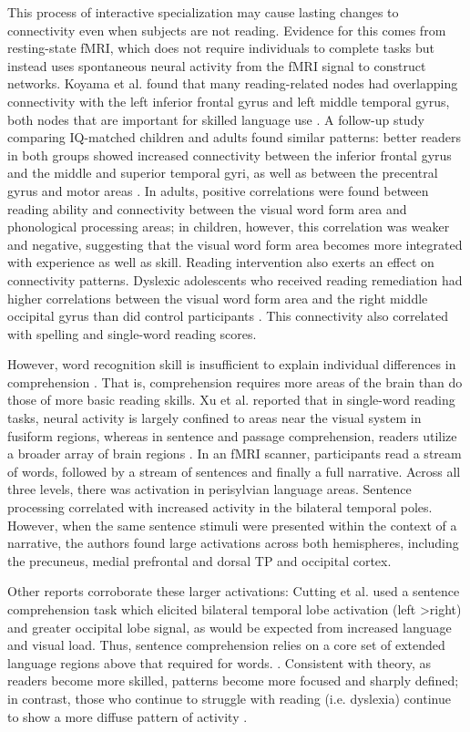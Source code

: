 This process of interactive specialization may cause lasting changes to connectivity even when subjects are not reading. Evidence for this comes from resting-state fMRI, which does not require individuals to complete tasks but instead uses spontaneous neural activity from the fMRI signal to construct networks. Koyama et al. found that many reading-related nodes had overlapping connectivity with the left inferior frontal gyrus and left middle temporal gyrus, both nodes that are important for skilled language use \cite{Koyama2010}. A follow-up study comparing IQ-matched children and adults found similar patterns: better readers in both groups showed increased connectivity between the inferior frontal gyrus and the middle and superior temporal gyri, as well as between the precentral gyrus and motor areas \cite{Koyama2011}. In adults, positive correlations were found between reading ability and connectivity between the visual word form area and phonological processing areas; in children, however, this correlation was weaker and negative, suggesting that the visual word form area becomes more integrated with experience as well as skill. Reading intervention also exerts an effect on connectivity patterns. Dyslexic adolescents who received reading remediation had higher correlations between the visual word form area and the right middle occipital gyrus than did control participants \cite{Koyama2013}. This connectivity also correlated with spelling and single-word reading scores.

However, word recognition skill is insufficient to explain individual differences in comprehension \cite{Gough1986, Hoover1990}. That is, comprehension requires more areas of the brain than do those of more basic reading skills. Xu et al. reported that in single-word reading tasks, neural activity is largely confined to areas near the visual system in fusiform regions, whereas in sentence and passage comprehension, readers utilize a broader array of brain regions \cite{Xu2005}. In an fMRI scanner, participants read a stream of words, followed by a stream of sentences and finally a full narrative. Across all three levels, there was activation in perisylvian language areas. Sentence processing correlated with increased activity in the bilateral temporal poles. However, when the same sentence stimuli were presented within the context of a narrative, the authors found large activations across both hemispheres, including the precuneus, medial prefrontal and dorsal TP and occipital cortex. 

Other reports corroborate these larger activations: Cutting et al. used a sentence comprehension task which elicited bilateral temporal lobe activation (left \textgreater right) and greater occipital lobe signal, as would be expected from increased language and visual load. Thus, sentence comprehension relies on a core set of extended language regions above that required for words.  \cite{Cutting2006a}. Consistent with theory, as readers become more skilled, patterns become more focused and sharply defined; in contrast, those who continue to struggle with reading (i.e. dyslexia) continue to show a more diffuse pattern of activity \cite{Rimrodt2009}. 

